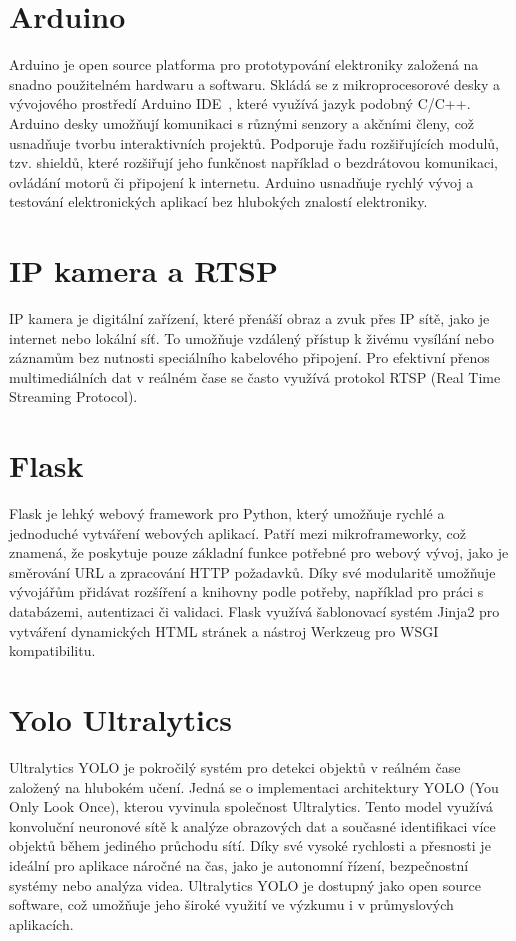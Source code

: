 \section{Arduino}\label{sec:arduino}
Arduino je open source platforma pro prototypování elektroniky založená na snadno použitelném hardwaru a softwaru.
Skládá se z mikroprocesorové desky a vývojového prostředí Arduino IDE~\cite{arduino-ide}, které využívá jazyk podobný C/C++.
Arduino desky umožňují komunikaci s různými senzory a akčními členy, což usnadňuje tvorbu interaktivních projektů.
Podporuje řadu rozšiřujících modulů, tzv. shieldů, které rozšiřují jeho funkčnost například o bezdrátovou komunikaci, ovládání motorů či připojení k internetu.
Arduino usnadňuje rychlý vývoj a testování elektronických aplikací bez hlubokých znalostí elektroniky.

\section{IP kamera a RTSP}\label{sec:ipcamera-rtsp}
IP kamera je digitální zařízení, které přenáší obraz a zvuk přes IP sítě, jako je internet nebo lokální síť.
To umožňuje vzdálený přístup k živému vysílání nebo záznamům bez nutnosti speciálního kabelového připojení.
Pro efektivní přenos multimediálních dat v reálném čase se často využívá protokol RTSP (Real Time Streaming Protocol).

\section{Flask}\label{sec:flask}
Flask je lehký webový framework pro Python, který umožňuje rychlé a jednoduché vytváření webových aplikací.
Patří mezi mikroframeworky, což znamená, že poskytuje pouze základní funkce potřebné pro webový vývoj, jako je směrování URL a zpracování HTTP požadavků.
Díky své modularitě umožňuje vývojářům přidávat rozšíření a knihovny podle potřeby, například pro práci s databázemi, autentizaci či validaci.
Flask využívá šablonovací systém Jinja2 pro vytváření dynamických HTML stránek a nástroj Werkzeug pro WSGI kompatibilitu.

\section{Yolo Ultralytics}\label{sec:yolo-ultralytics}
Ultralytics YOLO je pokročilý systém pro detekci objektů v reálném čase založený na hlubokém učení. Jedná se o implementaci architektury YOLO (You Only Look Once), kterou vyvinula společnost Ultralytics. Tento model využívá konvoluční neuronové sítě k analýze obrazových dat a současné identifikaci více objektů během jediného průchodu sítí. Díky své vysoké rychlosti a přesnosti je ideální pro aplikace náročné na čas, jako je autonomní řízení, bezpečnostní systémy nebo analýza videa. Ultralytics YOLO je dostupný jako open source software, což umožňuje jeho široké využití ve výzkumu i v průmyslových aplikacích.


